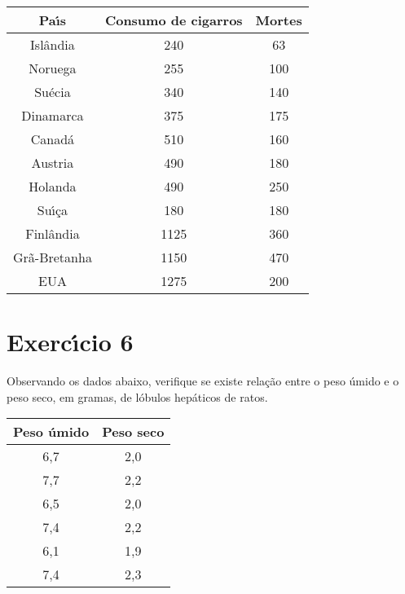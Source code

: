 \documentclass[a4paper,11pt,twoside,openright]{report}
\begin{document}
\begin{center}
\begin{tabular}{l|l|l}
\hline
\multicolumn{1}{c|}{Pa\'{\i}s} & \multicolumn{1}{c|}{Consumo de cigarros} & \multicolumn{1}{c}{Mortes} \\ 
\hline
\multicolumn{1}{c|}{Isl\^{a}ndia} & \multicolumn{1}{c|}{240} & \multicolumn{1}{c}{63} \\ 
\multicolumn{1}{c|}{Noruega} & \multicolumn{1}{c|}{255} & \multicolumn{1}{c}{100} \\ 
\multicolumn{1}{c|}{Su\'{e}cia} & \multicolumn{1}{c|}{340} & \multicolumn{1}{c}{140} \\ 
\multicolumn{1}{c|}{Dinamarca} & \multicolumn{1}{c|}{375} & \multicolumn{1}{c}{175} \\ 
\multicolumn{1}{c|}{Canad\'{a}} & \multicolumn{1}{c|}{510} & \multicolumn{1}{c}{160} \\ 
\multicolumn{1}{c|}{Austria} & \multicolumn{1}{c|}{490} & \multicolumn{1}{c}{180} \\ 
\multicolumn{1}{c|}{Holanda} & \multicolumn{1}{c|}{490} & \multicolumn{1}{c}{250} \\ 
\multicolumn{1}{c|}{Su\'{\i}\c{c}a} & \multicolumn{1}{c|}{180} & \multicolumn{1}{c}{180} \\ 
\multicolumn{1}{c|}{Finl\^{a}ndia} & \multicolumn{1}{c|}{1125} & \multicolumn{1}{c}{360} \\ 
\multicolumn{1}{c|}{Gr\~{a}-Bretanha} & \multicolumn{1}{c|}{1150} & \multicolumn{1}{c}{470} \\ 
\multicolumn{1}{c|}{EUA} & \multicolumn{1}{c|}{1275} & \multicolumn{1}{c}{200} \\ 
\hline
\end{tabular}
\end{center}


\section*{Exerc\'{\i}cio 6}
\hspace{0.5cm}Observando os dados abaixo, verifique se existe rela\c{c}\~{a}o entre o peso \'{u}mido e o peso seco, em gramas, de l\'{o}bulos hep\'{a}ticos
 de ratos.

\begin{center}
\begin{tabular}{l|l}
\hline
\multicolumn{1}{c|}{Peso \'{u}mido} & \multicolumn{1}{c}{Peso seco} \\ 
\hline
\multicolumn{1}{c|}{6,7} & \multicolumn{1}{c}{2,0} \\ 
\multicolumn{1}{c|}{7,7} & \multicolumn{1}{c}{2,2} \\ 
\multicolumn{1}{c|}{6,5} & \multicolumn{1}{c}{2,0} \\ 
\multicolumn{1}{c|}{7,4} & \multicolumn{1}{c}{2,2} \\ 
\multicolumn{1}{c|}{6,1} & \multicolumn{1}{c}{1,9} \\ 
\multicolumn{1}{c|}{7,4} & \multicolumn{1}{c}{2,3} \\ 
\hline
\end{tabular}
\end{center}
\end{document}
